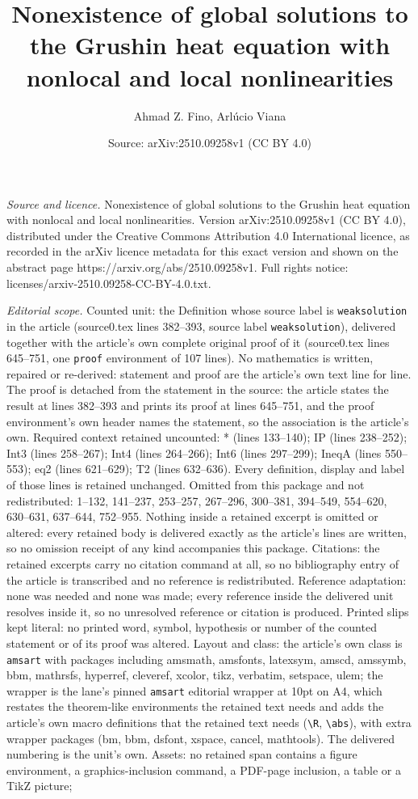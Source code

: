 \documentclass[10pt,a4paper]{amsart}
\title[Nonexistence of global solutions to the Grushin heat equatio]{Nonexistence of global solutions to the Grushin heat equation with nonlocal and local nonlinearities}
\author{Ahmad Z. Fino, Arl\'ucio Viana}
\date{Source: arXiv:2510.09258v1 (CC BY 4.0)}
\begin{document}
\maketitle

\noindent\emph{Source and licence.} Nonexistence of global solutions to the Grushin heat equation with nonlocal and local nonlinearities. Version arXiv:2510.09258v1 (CC BY 4.0), distributed under the Creative Commons Attribution 4.0 International licence, as recorded in the arXiv licence metadata for this exact version and shown on the abstract page https://arxiv.org/abs/2510.09258v1. Full rights notice: licenses/arxiv-2510.09258-CC-BY-4.0.txt.\par\smallskip

\noindent\textit{Editorial scope.} Counted unit: the Definition whose source label is \texttt{weaksolution} in the article (source0.tex lines 382--393, source label \texttt{weaksolution}), delivered together with the article's own complete original proof of it (source0.tex lines 645--751, one \texttt{proof} environment of 107 lines). No mathematics is written, repaired or re-derived: statement and proof are the article's own text line for line. The proof is detached from the statement in the source: the article states the result at lines 382--393 and prints its proof at lines 645--751, and the proof environment's own header names the statement, so the association is the article's own. Required context retained uncounted: * (lines 133--140); IP (lines 238--252); Int3 (lines 258--267); Int4 (lines 264--266); Int6 (lines 297--299); IneqA (lines 550--553); eq2 (lines 621--629); T2 (lines 632--636). Every definition, display and label of those lines is retained unchanged. Omitted from this package and not redistributed: 1--132, 141--237, 253--257, 267--296, 300--381, 394--549, 554--620, 630--631, 637--644, 752--955. Nothing inside a retained excerpt is omitted or altered: every retained body is delivered exactly as the article's lines are written, so no omission receipt of any kind accompanies this package. Citations: the retained excerpts carry no citation command at all, so no bibliography entry of the article is transcribed and no reference is redistributed. Reference adaptation: none was needed and none was made; every reference inside the delivered unit resolves inside it, so no unresolved reference or citation is produced. Printed slips kept literal: no printed word, symbol, hypothesis or number of the counted statement or of its proof was altered. Layout and class: the article's own class is \texttt{amsart} with packages including amsmath, amsfonts, latexsym, amscd, amssymb, bbm, mathrsfs, hyperref, cleveref, xcolor, tikz, verbatim, setspace, ulem; the wrapper is the lane's pinned \texttt{amsart} editorial wrapper at 10pt on A4, which restates the theorem-like environments the retained text needs and adds the article's own macro definitions that the retained text needs (\texttt{\textbackslash R}, \texttt{\textbackslash abs}), with extra wrapper packages (bm, bbm, dsfont, xspace, cancel, mathtools). The delivered numbering is the unit's own. Assets: no retained span contains a figure environment, a graphics-inclusion command, a PDF-page inclusion, a table or a TikZ picture; 
\end{document}
